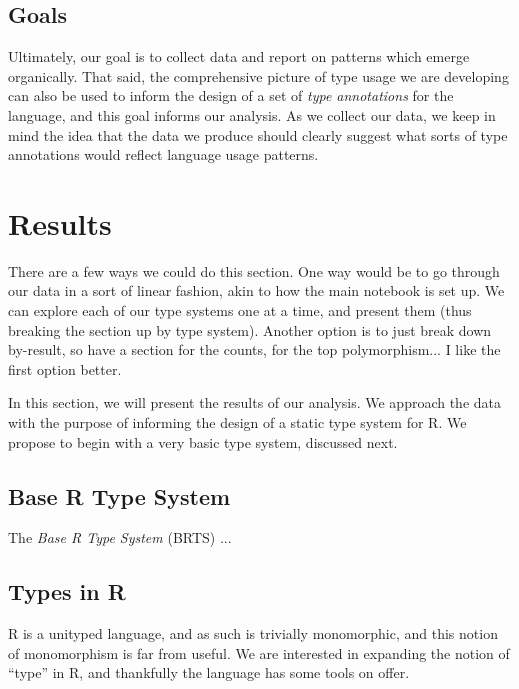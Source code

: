 \documentclass[acmsmall,10pt,review,anonymous]{acmart}\settopmatter{printfolios=true,printccs=false,printacmref=false}
\begin{document}

%
%
%
%
\subsection{Goals}

Ultimately, our goal is to collect data and report on patterns which emerge
organically.  That said, the comprehensive picture of type usage we are
developing can also be used to inform the design of a set of \textit{type
  annotations} for the language, and this goal informs our analysis.  As we
collect our data, we keep in mind the idea that the data we produce should
clearly suggest what sorts of type annotations would reflect language usage
patterns.

%
%
%
%
%
%
\section{Results}

 There are a few ways we could do this section.
One way would be to go through our data in a sort of linear fashion, akin to how the main notebook is set up.
We can explore each of our type systems one at a time, and present them (thus breaking the section up by type system).
Another option is to just break down by-result, so have a section for the counts, for the top polymorphism...
I like the first option better.

In this section, we will present the results of our analysis. 
We approach the data with the purpose of informing the design of a static type system for R.
We propose to begin with a very basic type system, discussed next.

\subsection{Base R Type System}

The {\it Base R Type System} (BRTS) ...

%
%
%
%
\subsection{Types in R}


R is a unityped language, and as such is trivially monomorphic, and this notion of monomorphism is far from useful.
We are interested in expanding the notion of ``type'' in R, and thankfully the language has some tools on offer.
\end{document}
